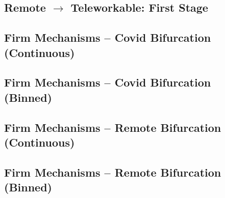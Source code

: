 \documentclass{article}
\newcommand{\cleanedresultsdir}{../../results/cleaned}
\begin{document}
\subsection{Remote $\rightarrow$ Teleworkable: First Stage}


\clearpage
\begin{landscape}
\subsection{Firm Mechanisms – Covid Bifurcation (Continuous)}

\end{landscape}

\begin{landscape}
\subsection{Firm Mechanisms – Covid Bifurcation (Binned)}

\end{landscape}

\begin{landscape}
\subsection{Firm Mechanisms – Remote Bifurcation (Continuous)}

\end{landscape}

\begin{landscape}
\subsection{Firm Mechanisms – Remote Bifurcation (Binned)}

\end{landscape}

\end{document}
